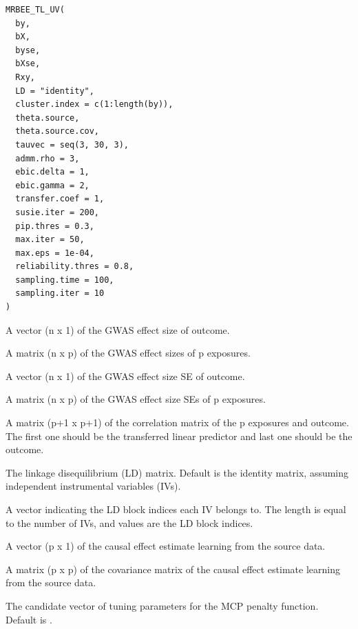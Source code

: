 \documentclass[a4paper]{book}
\begin{document}
%
\begin{Usage}
\begin{verbatim}
MRBEE_TL_UV(
  by,
  bX,
  byse,
  bXse,
  Rxy,
  LD = "identity",
  cluster.index = c(1:length(by)),
  theta.source,
  theta.source.cov,
  tauvec = seq(3, 30, 3),
  admm.rho = 3,
  ebic.delta = 1,
  ebic.gamma = 2,
  transfer.coef = 1,
  susie.iter = 200,
  pip.thres = 0.3,
  max.iter = 50,
  max.eps = 1e-04,
  reliability.thres = 0.8,
  sampling.time = 100,
  sampling.iter = 10
)
\end{verbatim}
\end{Usage}
%
\begin{Arguments}
\begin{ldescription}
\item[\code{by}] A vector (n x 1) of the GWAS effect size of outcome.

\item[\code{bX}] A matrix (n x p) of the GWAS effect sizes of p exposures.

\item[\code{byse}] A vector (n x 1) of the GWAS effect size SE of outcome.

\item[\code{bXse}] A matrix (n x p) of the GWAS effect size SEs of p exposures.

\item[\code{Rxy}] A matrix (p+1 x p+1) of the correlation matrix of the p exposures and outcome. The first one should be the transferred linear predictor and last one should be the outcome.

\item[\code{LD}] The linkage disequilibrium (LD) matrix. Default is the identity matrix, assuming independent instrumental variables (IVs).

\item[\code{cluster.index}] A vector indicating the LD block indices each IV belongs to. The length is equal to the number of IVs, and values are the LD block indices.

\item[\code{theta.source}] A vector (p x 1) of the causal effect estimate learning from the source data.

\item[\code{theta.source.cov}] A matrix (p x p) of the covariance matrix of the causal effect estimate learning from the source data.

\item[\code{tauvec}] The candidate vector of tuning parameters for the MCP penalty function. Default is .


\end{ldescription}
\end{Arguments}
\end{document}
